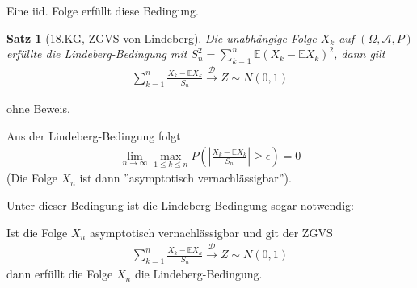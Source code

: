 \documentclass[]{article}
\newtheorem{theorem}{Satz}
\begin{document}
Eine iid. Folge erfüllt diese Bedingung.

\begin{theorem}[18.KG, ZGVS von Lindeberg]
	Die unabhängige Folge $X_k$ auf $(\Omega, \mathcal{A}, P)$ erfüllte die Lindeberg-Bedingung mit $S_n^2 = \sum_{k=1}^{n}\mathbb{E}(X_k - \mathbb{E}X_k)^2$, dann gilt
	\begin{align*}
		\sum_{k=1}^{n} \frac{X_k - \mathbb{E}X_k}{S_n} \xrightarrow{\mathcal{D}} Z \sim N(0,1)
	\end{align*}
\end{theorem}

ohne Beweis.

Aus der Lindeberg-Bedingung folgt
\begin{align*}
	\lim\limits_{n\rightarrow\infty} \max_{1\leq k \leq n} P\left(\left|\frac{X_k - \mathbb{E}X_k}{S_n}\right| \geq \epsilon\right) = 0
\end{align*}
(Die Folge $X_n$ ist dann ''asymptotisch vernachlässigbar'').

Unter dieser Bedingung ist die Lindeberg-Bedingung sogar notwendig:

Ist die Folge $X_n$ asymptotisch vernachlässigbar und git der ZGVS
\begin{align*}
	\sum_{k=1}^{n} \frac{X_k - \mathbb{E}X_k}{S_n} \xrightarrow{\mathcal{D}} Z \sim N(0,1)
\end{align*}
dann erfüllt die Folge $X_n$ die Lindeberg-Bedingung.
\end{document}
